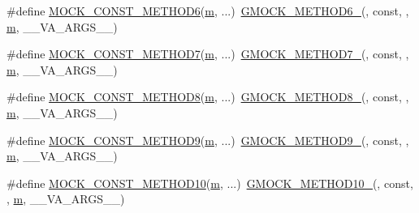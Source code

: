 \begin{DoxyCompactItemize}
\item 
\#define \hyperlink{gmock-generated-function-mockers_8h_a5081a185ba264d599357398952c23af1}{M\+O\+C\+K\+\_\+\+C\+O\+N\+S\+T\+\_\+\+M\+E\+T\+H\+O\+D6}(\hyperlink{app_2main_8cpp_a0d2d8836216fc94b61aa0824eb239db2}{m}, ...)~\hyperlink{gmock-generated-function-mockers_8h_ad0ca7f6973a076d0af4c953f8ed91842}{G\+M\+O\+C\+K\+\_\+\+M\+E\+T\+H\+O\+D6\+\_\+}(, const, , \hyperlink{app_2main_8cpp_a0d2d8836216fc94b61aa0824eb239db2}{m}, \+\_\+\+\_\+\+V\+A\+\_\+\+A\+R\+G\+S\+\_\+\+\_\+)
\item 
\#define \hyperlink{gmock-generated-function-mockers_8h_a0f0e63ed14beab1d85f0160bdbed9930}{M\+O\+C\+K\+\_\+\+C\+O\+N\+S\+T\+\_\+\+M\+E\+T\+H\+O\+D7}(\hyperlink{app_2main_8cpp_a0d2d8836216fc94b61aa0824eb239db2}{m}, ...)~\hyperlink{gmock-generated-function-mockers_8h_ab98a8399ba62b53b375c2807f4d39d2f}{G\+M\+O\+C\+K\+\_\+\+M\+E\+T\+H\+O\+D7\+\_\+}(, const, , \hyperlink{app_2main_8cpp_a0d2d8836216fc94b61aa0824eb239db2}{m}, \+\_\+\+\_\+\+V\+A\+\_\+\+A\+R\+G\+S\+\_\+\+\_\+)
\item 
\#define \hyperlink{gmock-generated-function-mockers_8h_a614ee58b7c9ab72e90c850d4bb97a502}{M\+O\+C\+K\+\_\+\+C\+O\+N\+S\+T\+\_\+\+M\+E\+T\+H\+O\+D8}(\hyperlink{app_2main_8cpp_a0d2d8836216fc94b61aa0824eb239db2}{m}, ...)~\hyperlink{gmock-generated-function-mockers_8h_aa84a36427c44505207b7cad5dec7ad67}{G\+M\+O\+C\+K\+\_\+\+M\+E\+T\+H\+O\+D8\+\_\+}(, const, , \hyperlink{app_2main_8cpp_a0d2d8836216fc94b61aa0824eb239db2}{m}, \+\_\+\+\_\+\+V\+A\+\_\+\+A\+R\+G\+S\+\_\+\+\_\+)
\item 
\#define \hyperlink{gmock-generated-function-mockers_8h_ab7429646bacf56a7d560a3d81d497880}{M\+O\+C\+K\+\_\+\+C\+O\+N\+S\+T\+\_\+\+M\+E\+T\+H\+O\+D9}(\hyperlink{app_2main_8cpp_a0d2d8836216fc94b61aa0824eb239db2}{m}, ...)~\hyperlink{gmock-generated-function-mockers_8h_aa820171a19cc587c247dbe05cbffc55f}{G\+M\+O\+C\+K\+\_\+\+M\+E\+T\+H\+O\+D9\+\_\+}(, const, , \hyperlink{app_2main_8cpp_a0d2d8836216fc94b61aa0824eb239db2}{m}, \+\_\+\+\_\+\+V\+A\+\_\+\+A\+R\+G\+S\+\_\+\+\_\+)
\item 
\#define \hyperlink{gmock-generated-function-mockers_8h_a4f16ede0ef660fb6dc49e5f5d226fbf9}{M\+O\+C\+K\+\_\+\+C\+O\+N\+S\+T\+\_\+\+M\+E\+T\+H\+O\+D10}(\hyperlink{app_2main_8cpp_a0d2d8836216fc94b61aa0824eb239db2}{m}, ...)~\hyperlink{gmock-generated-function-mockers_8h_a81a48223a8771de36ef92ac6d56f6e81}{G\+M\+O\+C\+K\+\_\+\+M\+E\+T\+H\+O\+D10\+\_\+}(, const, , \hyperlink{app_2main_8cpp_a0d2d8836216fc94b61aa0824eb239db2}{m}, \+\_\+\+\_\+\+V\+A\+\_\+\+A\+R\+G\+S\+\_\+\+\_\+)

\end{DoxyCompactItemize}
